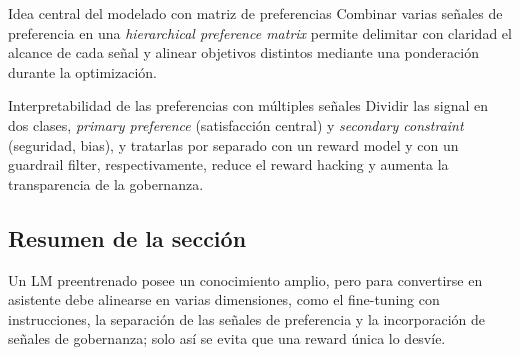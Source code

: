 \begin{knowledgebox}{Idea central del modelado con matriz de preferencias}
Combinar varias señales de preferencia en una \textit{hierarchical preference matrix} permite delimitar con claridad el alcance de cada señal y alinear objetivos distintos mediante una ponderación durante la optimización.
\end{knowledgebox}

\begin{importantbox}{Interpretabilidad de las preferencias con múltiples señales}
Dividir las signal en dos clases, \textit{primary preference} (satisfacción central) y \textit{secondary constraint} (seguridad, bias), y tratarlas por separado con un reward model y con un guardrail filter, respectivamente, reduce el reward hacking y aumenta la transparencia de la gobernanza.
\end{importantbox}

\subsection{Resumen de la sección}

Un LM preentrenado posee un conocimiento amplio, pero para convertirse en asistente debe alinearse en varias dimensiones, como el fine-tuning con instrucciones, la separación de las señales de preferencia y la incorporación de señales de gobernanza; solo así se evita que una reward única lo desvíe.
